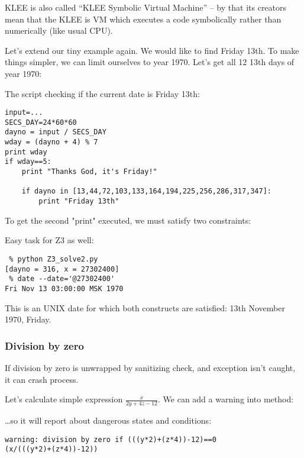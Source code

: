 KLEE is also called ``KLEE Symbolic Virtual Machine'' -- by that its creators mean that the KLEE is \ac{VM} which executes a code symbolically rather than numerically (like usual \ac{CPU}).

Let's extend our tiny example again.
We would like to find Friday 13th. To make things simpler, we can limit ourselves to year 1970.
Let's get all 12 13th days of year 1970:



The script checking if the current date is Friday 13th:

\begin{lstlisting}
input=...
SECS_DAY=24*60*60
dayno = input / SECS_DAY
wday = (dayno + 4) % 7
print wday
if wday==5:
    print "Thanks God, it's Friday!"
 
    if dayno in [13,44,72,103,133,164,194,225,256,286,317,347]:
        print "Friday 13th"
\end{lstlisting}

To get the second "print" executed, we must satisfy two constraints:



Easy task for Z3 as well:

\begin{lstlisting}
 % python Z3_solve2.py
[dayno = 316, x = 27302400]
 % date --date='@27302400'
Fri Nov 13 03:00:00 MSK 1970
\end{lstlisting}

This is an UNIX date for which both constructs are satisfied: 13th November 1970, Friday.

\subsubsection{Division by zero}

If division by zero is unwrapped by sanitizing check, and exception isn't caught, it can crash process.

Let's calculate simple expression $\frac{x}{2y + 4z - 12}$.
We can add a warning into  method:



\dots so it will report about dangerous states and conditions:

\begin{lstlisting}
warning: division by zero if (((y*2)+(z*4))-12)==0
(x/(((y*2)+(z*4))-12))
\end{lstlisting}

